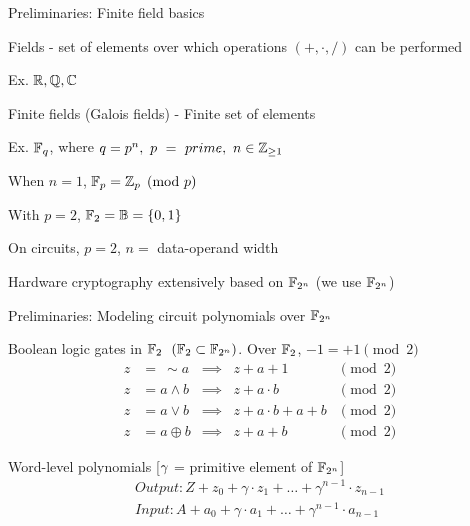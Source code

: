 \begin{frame}{\large Preliminaries: Finite field basics}
\bi
	\item Fields - set of elements over which operations $(+,\cdot,/)$ can be performed 
	\bi
		\item Ex. ${\mathbb{R}},{\mathbb{Q}},{\mathbb{C}}$
	\ei
	\vspace{0.1in}
	\item Finite fields (Galois fields) - Finite set of elements
	\bi
		\item Ex. ${\mathbb{F}}_q$, where $q=p^n,~p~=~prime,~n \in {\mathbb{Z}}_{\geq 1}$ 
		\bi
		\item When $n=1$, ${\mathbb{F}}_p = {\mathbb{Z}}_p \pmod{p}$
		\item With $p=2$, ${\mathbb{F}}_2 = {\mathbb{B}} = \{0,1\}$
		\ei
		\item On circuits, $p=2$, $n=$ data-operand width
	\ei
	\vspace{0.1in}
	\item Hardware cryptography extensively based on ${\mathbb{F}}_{2^n}$ (we use ${\mathbb{F}}_{2^n}$)
\ei
\end{frame}

\begin{frame}{\large Preliminaries: Modeling circuit polynomials over ${\mathbb{F}}_{2^n}$}
\bi
	\item Boolean logic gates in ${\mathbb{F}}_2 ~~({\mathbb{F}}_2 \subset {\mathbb{F}}_{2^n})$. Over ${\mathbb{F}}_2$, $-1=+1\pmod{2}$
\ei
	\begin{align*}
		 z &=~ \sim a &\implies &z+a+1 &\pmod{2}\\
		 z &= a \wedge b &\implies &z+a\cdot b &\pmod{2}\\
		 z &= a \vee b &\implies &z+a\cdot b + a + b &\pmod{2}\\
		 z &= a \oplus b &\implies &z+a+b &\pmod{2}
	\end{align*}

\bi
	\item Word-level polynomials [$\gamma$ = primitive element of ${\mathbb{F}}_{2^n}$]
\ei
\begin{equation*}
\begin{split}
 Output:  Z + z_0 +\gamma \cdot  z_1 + \dots +\gamma^{n-1} \cdot z_{n-1}\\
 Input:  A + a_0 +\gamma \cdot a_1 + \dots +\gamma^{n-1} \cdot a_{n-1}
\end{split}
\end{equation*}
\end{frame}

